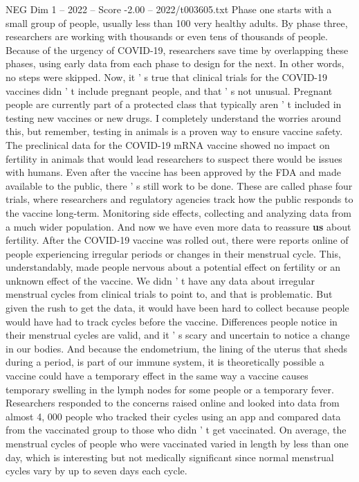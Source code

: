 \begin{textsample}{NEG Dim 1 – 2022 – Score -2.00 – 2022/t003605.txt}
Phase one starts with a small group of people, usually less than 100 very healthy adults.
By phase three, researchers are working with thousands or even tens of thousands of people.
Because of the urgency of COVID-19, researchers save time by overlapping these phases, using early data from each phase to design for the next.
In other words, no steps were skipped.
Now, it ' s true that clinical trials for the COVID-19 vaccines didn ' t include pregnant people, and that ' s not unusual.
Pregnant people are currently part of a protected class that typically aren ' t included in testing new vaccines or new drugs.
I completely understand the worries around this, but remember, testing in animals is a proven way to ensure vaccine safety.
The preclinical data for the COVID-19 mRNA vaccine showed no impact on fertility in animals that would lead researchers to suspect there would be issues with humans.
Even after the vaccine has been approved by the FDA and made available to the public, there ' s still work to be done.
These are called phase four trials, where researchers and regulatory agencies track how the public responds to the vaccine long-term.
Monitoring side effects, collecting and analyzing data from a much wider population.
And now we have even more data to reassure \textbf{us} about fertility.
After the COVID-19 vaccine was rolled out, there were reports online of people experiencing irregular periods or changes in their menstrual cycle.
This, understandably, made people nervous about a potential effect on fertility or an unknown effect of the vaccine.
We didn ' t have any data about irregular menstrual cycles from clinical trials to point to, and that is problematic.
But given the rush to get the data, it would have been hard to collect because people would have had to track cycles before the vaccine.
Differences people notice in their menstrual cycles are valid, and it ' s scary and uncertain to notice a change in our bodies.
And because the endometrium, the lining of the uterus that sheds during a period, is part of our immune system, it is theoretically possible a vaccine could have a temporary effect in the same way a vaccine causes temporary swelling in the lymph nodes for some people or a temporary fever.
Researchers responded to the concerns raised online and looked into data from almost 4, 000 people who tracked their cycles using an app and compared data from the vaccinated group to those who didn ' t get vaccinated.
On average, the menstrual cycles of people who were vaccinated varied in length by less than one day, which is interesting but not medically significant since normal menstrual cycles vary by up to seven days each cycle.

\end{textsample}

